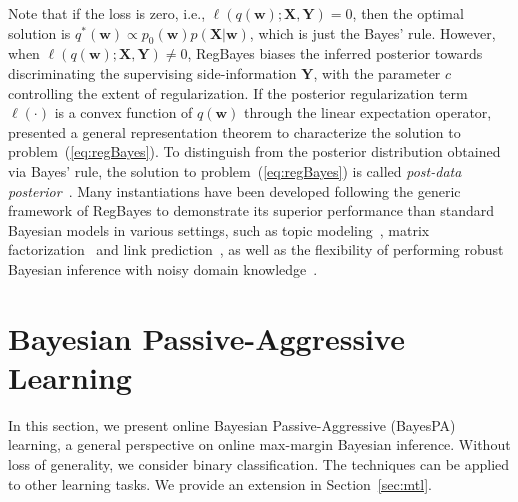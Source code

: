 \documentclass[twoside,11pt]{article}
\newcommand{\Xv}{\bm{X}}
\newcommand{\Yv}{\bm{Y}}
\newcommand{\wv}{\bm{w}}
\newcommand{\loss}{\ell}
\newcommand{\ud}{\mathrm{d}}
\newcommand{\KL}{\textbf{KL}}
\newcommand{\junx}[1]{{\color{red}{\bf\sf #1}}}
\begin{document}
Note that if the loss is zero, i.e., $\loss(q(\wv); \Xv, \Yv) = 0$, then the optimal solution is $q^*(\wv) \propto p_0(\wv) p(\Xv | \wv)$, which is just the Bayes' rule. However, when $\loss(q(\wv); \Xv, \Yv) \not= 0$, RegBayes biases the inferred posterior towards discriminating the supervising side-information $\Yv$, with the parameter $c$ controlling the extent of regularization. If the posterior regularization term $\ell(\cdot)$ is a convex function of $q(\wv)$ through the linear expectation operator, \cite{zhu2013bayesian} presented a general representation theorem to characterize the solution to problem~(\ref{eq:regBayes}). To distinguish from the posterior distribution obtained via Bayes' rule, the solution to problem~(\ref{eq:regBayes}) is called {\it post-data posterior}~\citep{zhu2013bayesian}. Many instantiations have been developed following the generic framework of RegBayes to demonstrate its superior performance than standard Bayesian models in various settings, such as topic modeling~\citep{jiang2012monte,zhugibbs2013}, matrix factorization~\citep{xu2013fast} and link prediction~\citep{zhu2012maxlink}, as well as the flexibility of performing robust Bayesian inference with noisy domain knowledge~\citep{Mei:ICML2014}.





\section{Bayesian Passive-Aggressive Learning}\label{sec:bpal}


In this section, we present online Bayesian Passive-Aggressive (BayesPA) learning, a general perspective on online max-margin Bayesian inference. Without loss of generality, we consider binary classification. The techniques can be applied to other learning tasks. We provide an extension in Section~\ref{sec:mtl}.
\end{document}
